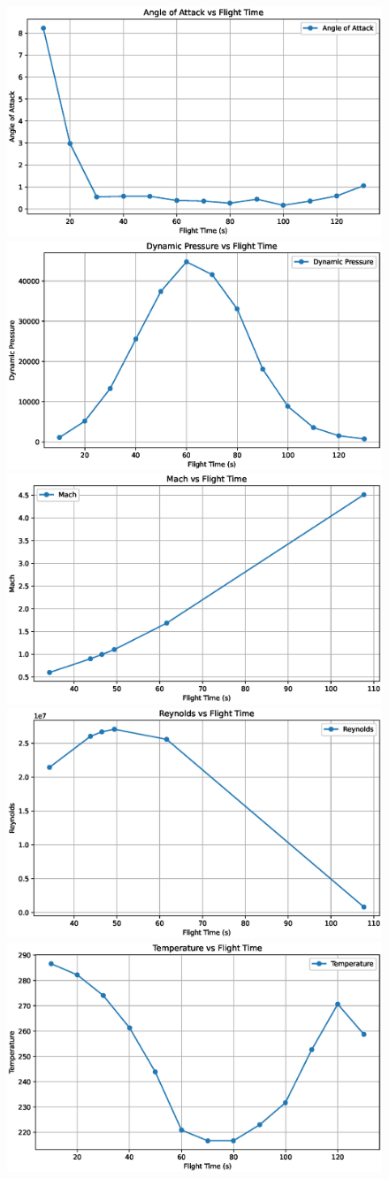 \documentclass[12pt]{article}
\begin{document}
\begin{figure}[H]
    \centering
    \includegraphics[width=0.495\linewidth]{figs/eris/S123F/AngleofAttack.eps}
    \includegraphics[width=0.495\linewidth]{figs/eris/S123F/DynamicPressure.eps}\\
    \includegraphics[width=0.495\linewidth]{figs/eris/S123F/Mach.eps}
    \includegraphics[width=0.495\linewidth]{figs/eris/S123F/Reynolds.eps}\\
    \includegraphics[width=0.495\linewidth]{figs/eris/S123F/Temperature.eps}

\end{figure}
\end{document}
